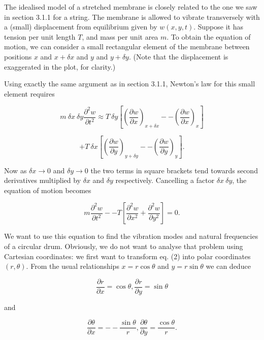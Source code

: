   The idealised model of a stretched membrane is closely related to the one we 
  saw in section 3.1.1 for a string. The membrane is allowed to vibrate 
  transversely with a (small) displacement from equilibrium given by 
  $w(x,y,t)$. Suppose it has tension per unit length $T$, and mass per unit 
  area $m$. To obtain the equation of motion, we can consider a small 
  rectangular element of the membrane between positions $x$ and $x+ \delta x$ 
  and $y$ and $y+ \delta y$. (Note that the displacement is exaggerated in the 
  plot, for clarity.) 


  Using exactly the same argument as in section 3.1.1, Newton's law for this 
  small element requires 

  $$m~\delta x~\delta y \frac{\partial^2 w}{\partial t^2} \approx T~\delta y 
  \left[ \left( \frac{\partial w}{\partial x} \right) _{x + \delta x} -- \left( 
  \frac{\partial w}{\partial x} \right) _{x} \right] $$ 

  $$+ T~\delta x \left[ \left( \frac{\partial w}{\partial y} \right) _{y + 
  \delta y} -- \left( \frac{\partial w}{\partial y} \right) _{y} \right] 
  .\tag{1}$$ 

  Now as $\delta x \rightarrow 0$ and $\delta y \rightarrow 0$ the two terms in 
  square brackets tend towards second derivatives multiplied by $\delta x$ and 
  $\delta y$ respectively. Cancelling a factor $\delta x ~ \delta y$, the 
  equation of motion becomes 

  $$m \frac{\partial^2 w}{\partial t^2} -- T \left[ \dfrac{\partial^2 
  w}{\partial x^2} + \dfrac{\partial^2 w}{\partial y^2} \right] =0 .\tag{2}$$ 

  We want to use this equation to find the vibration modes and natural 
  frequencies of a circular drum. Obviously, we do not want to analyse that 
  problem using Cartesian coordinates: we first want to transform eq. (2) into 
  polar coordinates $(r, \theta)$. From the usual relationships $x=r \cos 
  \theta$ and $y = r \sin \theta$ we can deduce 

  $$\frac{\partial r}{\partial x} = \cos \theta, \frac{\partial r}{\partial y} 
  = \sin \theta \tag{3}$$ 

  and 

  $$\frac{\partial \theta}{\partial x} = -- \frac{\sin \theta}{r}, 
  \frac{\partial \theta}{\partial y} = \frac{\cos \theta}{r} . \tag{4}$$ 

